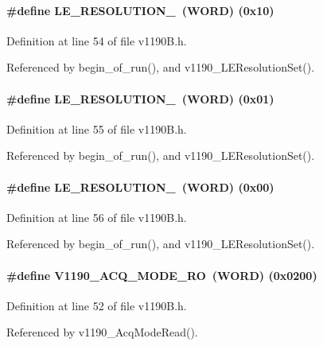 \paragraph[{LE\_\-RESOLUTION\_\-100}]{\setlength{\rightskip}{0pt plus 5cm}\#define LE\_\-RESOLUTION\_~({\bf WORD}) (0x10)}\hfill\label{v1190B_8h_a6b124d6638860913a000ec71a10412f0}


Definition at line 54 of file v1190B.h.

Referenced by begin\_\-of\_\-run(), and v1190\_\-LEResolutionSet().
\paragraph[{LE\_\-RESOLUTION\_\-200}]{\setlength{\rightskip}{0pt plus 5cm}\#define LE\_\-RESOLUTION\_~({\bf WORD}) (0x01)}\hfill\label{v1190B_8h_ac6023e0596d452026a97581eae04bf1b}


Definition at line 55 of file v1190B.h.

Referenced by begin\_\-of\_\-run(), and v1190\_\-LEResolutionSet().
\paragraph[{LE\_\-RESOLUTION\_\-800}]{\setlength{\rightskip}{0pt plus 5cm}\#define LE\_\-RESOLUTION\_~({\bf WORD}) (0x00)}\hfill\label{v1190B_8h_af203e58693ac94231188c6ac4d28723c}


Definition at line 56 of file v1190B.h.

Referenced by begin\_\-of\_\-run(), and v1190\_\-LEResolutionSet().
\paragraph[{V1190\_\-ACQ\_\-MODE\_\-RO}]{\setlength{\rightskip}{0pt plus 5cm}\#define V1190\_\-ACQ\_\-MODE\_\-RO~({\bf WORD}) (0x0200)}\hfill\label{v1190B_8h_abad67749f23decb85d8b881d33b296f9}


Definition at line 52 of file v1190B.h.

Referenced by v1190\_\-AcqModeRead().
